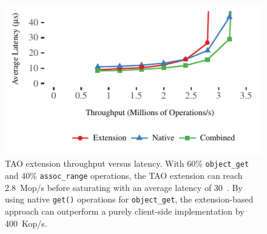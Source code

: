 \begin{figure}[t]
\centering
\includegraphics[width=1.0\columnwidth]{graphs/tao.pdf}
  \caption{TAO extension throughput versus latency. With 60\%
    \texttt{object\_get} and 40\% \texttt{assoc\_range} operations,
    the TAO extension can reach 2.8~Mop/s
    before saturating with an average latency of 30~\us. By using
    native \texttt{get()} operations for \texttt{object\_get}, the
    extension-based approach can outperform a purely client-side
    implementation by 400~Kop/s.}
\label{fig:tao-bench}
\end{figure}
